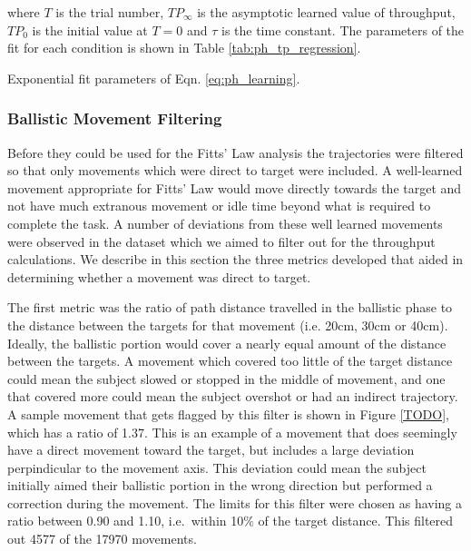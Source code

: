 where $T$ is the trial number, ${TP}_{\infty}$ is the asymptotic learned value of throughput, ${TP}_0$ is the initial value at $T=0$ and $\tau$ is the time constant.
The parameters of the fit for each condition is shown in Table \ref{tab:ph_tp_regression}.

\begin{table}
    \centering
    \caption{Exponential fit parameters of Eqn. \ref{eq:ph_learning}.}
    \label{tab:ph_tp_regression}
\end{table}

\subsubsection{Ballistic Movement Filtering}

Before they could be used for the Fitts' Law analysis the trajectories were filtered so that only movements which were direct to target were included.
A well-learned movement appropriate for Fitts' Law would move directly towards the target and not have much extranous movement or idle time beyond what is required to complete the task.
A number of deviations from these well learned movements were observed in the dataset which we aimed to filter out for the throughput calculations.
We describe in this section the three metrics developed that aided in determining whether a movement was direct to target.


The first metric was the ratio of path distance travelled in the ballistic phase to the distance between the targets for that movement (i.e. 20cm, 30cm or 40cm).
Ideally, the ballistic portion would cover a nearly equal amount of the distance between the targets.
A movement which covered too little of the target distance could mean the subject slowed or stopped in the middle of movement, and one that covered more could mean the subject overshot or had an indirect trajectory.
A sample movement that gets flagged by this filter is shown in Figure \ref{TODO}, which has a ratio of 1.37.
This is an example of a movement that does seemingly have a direct movement toward the target, but includes a large deviation perpindicular to the movement axis.
This deviation could mean the subject initially aimed their ballistic portion in the wrong direction but performed a correction during the movement.
The limits for this filter were chosen as having a ratio between 0.90 and 1.10, i.e.\ within 10\% of the target distance.
This filtered out 4577 of the 17970 movements.

